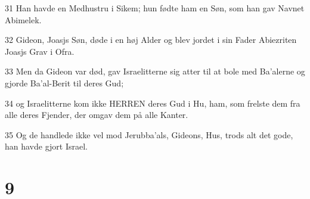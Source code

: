\par 31 Han havde en Medhustru i Sikem; hun fødte ham en Søn, som han gav Navnet Abimelek.
\par 32 Gideon, Joasjs Søn, døde i en høj Alder og blev jordet i sin Fader Abiezriten Joasjs Grav i Ofra.
\par 33 Men da Gideon var død, gav Israelitterne sig atter til at bole med Ba'alerne og gjorde Ba'al-Berit til deres Gud;
\par 34 og Israelitterne kom ikke HERREN deres Gud i Hu, ham, som frelste dem fra alle deres Fjender, der omgav dem på alle Kanter.
\par 35 Og de handlede ikke vel mod Jerubba'als, Gideons, Hus, trods alt det gode, han havde gjort Israel.

\chapter{9}

